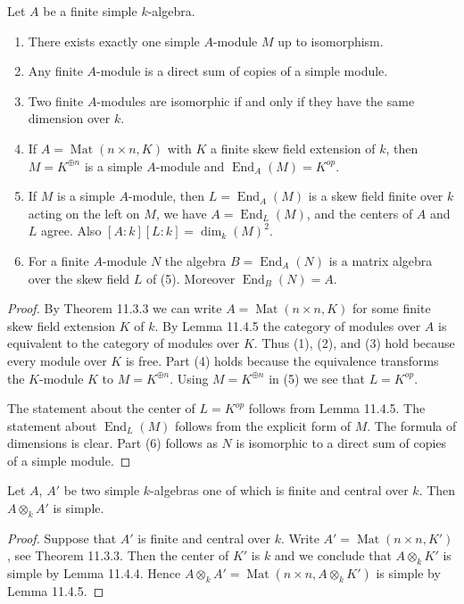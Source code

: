 \begin{lemma}[11.4.6, Tag 074E]
Let $A$ be a finite simple $k$-algebra.
\begin{enumerate}
\item There exists exactly one simple $A$-module $M$ up to isomorphism.
\item Any finite $A$-module is a direct sum of copies of a simple module.
\item Two finite $A$-modules are isomorphic if and only if they have the same dimension over $k$.
\item If $A=\operatorname{Mat}(n\times n,K)$ with $K$ a finite skew field extension of $k$, then $M=K^{\oplus n}$ is a simple $A$-module and $\operatorname{End}_A(M)=K^{op}$.
\item If $M$ is a simple $A$-module, then $L=\operatorname{End}_A(M)$ is a skew field finite over $k$ acting on the left on $M$, we have $A=\operatorname{End}_L(M)$, and the centers of $A$ and $L$ agree. Also $[A:k][L:k]=\dim_k(M)^2$.
\item For a finite $A$-module $N$ the algebra $B=\operatorname{End}_A(N)$ is a matrix algebra over the skew field $L$ of (5). Moreover $\operatorname{End}_B(N)=A$.
\end{enumerate}
\end{lemma}
\begin{proof}
By Theorem 11.3.3 we can write $A=\operatorname{Mat}(n\times n,K)$ for some finite skew field extension $K$ of $k$. By Lemma 11.4.5 the category of modules over $A$ is equivalent to the category of modules over $K$. Thus (1), (2), and (3) hold because every module over $K$ is free. Part (4) holds because the equivalence transforms the $K$-module $K$ to $M=K^{\oplus n}$. Using $M=K^{\oplus n}$ in (5) we see that $L=K^{op}$.

The statement about the center of $L=K^{op}$ follows from Lemma 11.4.5. The statement about $\operatorname{End}_L(M)$ follows from the explicit form of $M$. The formula of dimensions is clear. Part (6) follows as $N$ is isomorphic to a direct sum of copies of a simple module.
\end{proof}

\begin{lemma}[11.4.7, Tag 074F]
Let $A$, $A'$ be two simple $k$-algebras one of which is finite and central over $k$. Then $A\otimes_k A'$ is simple.
\end{lemma}
\begin{proof}
Suppose that $A'$ is finite and central over $k$. Write $A'=\operatorname{Mat}(n\times n,K')$, see Theorem 11.3.3. Then the center of $K'$ is $k$ and we conclude that $A\otimes_k K'$ is simple by Lemma 11.4.4. Hence $A\otimes_k A'=\operatorname{Mat}(n\times n,A\otimes_k K')$ is simple by Lemma 11.4.5.
\end{proof}


